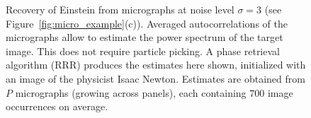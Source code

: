 \documentclass[english,11pt]{article}
\newcommand{\1}{\mathbf{1}}
\newcommand{\TODO}[1]{{\color{red}{[#1]}}}
\numberwithin{equation}{section}
\theoremstyle{plain}
\theoremstyle{definition}
\theoremstyle{remark}
\theoremstyle{plain}
\theoremstyle{remark}
\theoremstyle{plain}
\theoremstyle{plain}
\newcommand{\SNR}{\ensuremath{\textsf{SNR}}}
\begin{document}
\begin{figure}[h!]

	\caption{\label{fig:Einst_example} Recovery of Einstein from micrographs at noise level $\sigma = 3$ (see Figure~\ref{fig:micro_example}(c)). Averaged autocorrelations of the micrographs allow to estimate the power spectrum of the target image. This does not require particle picking. A phase retrieval algorithm (RRR) produces the estimates here shown, initialized with an image of the physicist Isaac Newton. Estimates are obtained from $P$ micrographs (growing across panels), each containing $700$ image occurrences on average.
		\TODO{To add: redo the figures according to Amit's comments and the figures of noisy Einstein's micrographs}
	}
\end{figure}
\end{document}

